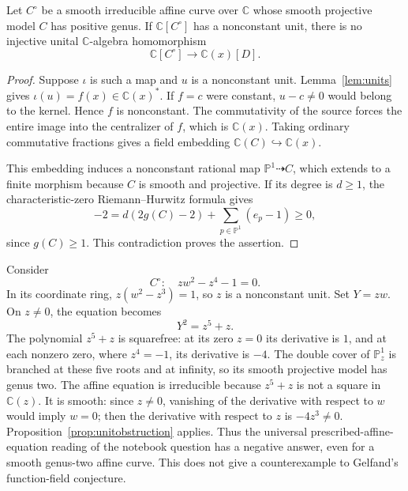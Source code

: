 \begin{proposition}\ours\quad
\label{prop:unitobstruction}
Let \(C^\circ\) be a smooth irreducible affine curve over \(\mathbb C\) whose smooth projective model \(C\) has positive genus. If \(\mathbb C[C^\circ]\) has a nonconstant unit, there is no injective unital \(\mathbb C\)-algebra homomorphism
\[
 \mathbb C[C^\circ]\longrightarrow \mathbb C(x)[D].
\]
\end{proposition}
\begin{proof}
Suppose \(\iota\) is such a map and \(u\) is a nonconstant unit. Lemma~\ref{lem:units} gives \(\iota(u)=f(x)\in\mathbb C(x)^*\). If \(f=c\) were constant, \(u-c\ne0\) would belong to the kernel. Hence \(f\) is nonconstant. The commutativity of the source forces the entire image into the centralizer of \(f\), which is \(\mathbb C(x)\). Taking ordinary commutative fractions gives a field embedding
\(\mathbb C(C)\hookrightarrow\mathbb C(x)\).

This embedding induces a nonconstant rational map \(\mathbb P^1\dashrightarrow C\), which extends to a finite morphism because \(C\) is smooth and projective. If its degree is \(d\ge1\), the characteristic-zero Riemann--Hurwitz formula gives
\[
 -2=d(2g(C)-2)+\sum_{p\in\mathbb P^1}(e_p-1)\ge0,
\]
since \(g(C)\ge1\). This contradiction proves the assertion.
\end{proof}

\begin{example}\ours\quad
\label{ex:affineobstruction}
Consider
\[
 C^\circ:\quad z w^2-z^4-1=0.
\]
In its coordinate ring, \(z(w^2-z^3)=1\), so \(z\) is a nonconstant unit. Set \(Y=zw\). On \(z\ne0\), the equation becomes
\[
 Y^2=z^5+z.
\]
The polynomial \(z^5+z\) is squarefree: at its zero \(z=0\) its derivative is \(1\), and at each nonzero zero, where \(z^4=-1\), its derivative is \(-4\). The double cover of \(\mathbb P^1_z\) is branched at these five roots and at infinity, so its smooth projective model has genus two. The affine equation is irreducible because \(z^5+z\) is not a square in \(\mathbb C(z)\). It is smooth: since \(z\ne0\), vanishing of the derivative with respect to \(w\) would imply \(w=0\); then the derivative with respect to \(z\) is \(-4z^3\ne0\). Proposition~\ref{prop:unitobstruction} applies. Thus the universal prescribed-affine-equation reading of the notebook question has a negative answer, even for a smooth genus-two affine curve. This does not give a counterexample to Gelfand's function-field conjecture.
\end{example}


